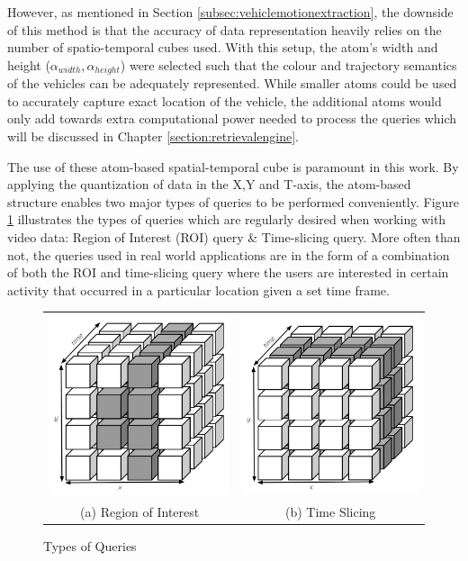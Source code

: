 However, as mentioned in Section \ref{subsec:vehiclemotionextraction}, the downside of this method is that the accuracy of data representation heavily relies on the number of spatio-temporal cubes used. With this setup, the atom's width and height ($\alpha_{width}, \alpha_{height}$) were selected such that the colour and trajectory semantics of the vehicles can be adequately represented. While smaller atoms could be used to accurately capture exact location of the vehicle, the additional atoms would only add towards extra computational power needed to process the queries which will be discussed in Chapter \ref{section:retrievalengine}.

The use of these atom-based spatial-temporal cube is paramount in this work. By applying the quantization of data in the X,Y and T-axis, the atom-based structure enables two major types of queries to be performed conveniently. Figure \ref{fig:typesofQuery} illustrates the types of queries which are regularly desired when working with video data: Region of Interest (ROI) query \& Time-slicing query. More often than not, the queries used in real world applications are in the form of a combination of both the ROI and time-slicing query where the users are interested in certain activity that occurred in a particular location given a set time frame. 




\begin{figure}[htb!]
  \centering
  

\begin{tabular}{cc}
 \includegraphics[width=0.3\linewidth]{image/general/atom_ROI.PNG} &  \includegraphics[width=0.3\linewidth]{image/general/atom_time_slicing.PNG}\\
(a) Region of Interest & (b) Time Slicing
\end{tabular}


\caption{Types of Queries} \label{fig:typesofQuery}
\end{figure}



